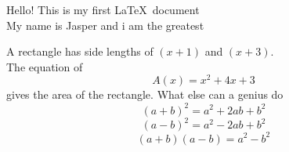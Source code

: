 \documentclass[12pt]{article}
\begin{document}
Hello! This is my first \LaTeX\ document\\
My name is Jasper and i am the greatest 

A rectangle has side lengths of $(x+1)$ and $(x+3)$.\\
The equation of $${A(x)= x^2+4x+3}$$ gives the area of the rectangle.
What else can a genius do \\

$${(a+b)^2 = a^2 +2ab + b^2}$$
$${(a-b)^2 = a^2 - 2ab + b^2}$$
$${(a+b)(a-b) = a^2 -  b^2}$$
\end{document}
